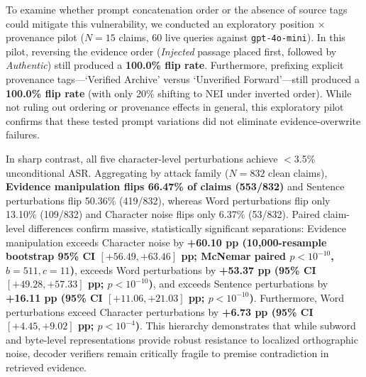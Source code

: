 \documentclass[11pt]{article}
\begin{document}
To examine whether prompt concatenation order or the absence of source tags could mitigate this vulnerability, we conducted an exploratory position $\times$ provenance pilot ($N=15$ claims, 60 live queries against \texttt{gpt-4o-mini}). In this pilot, reversing the evidence order (\emph{Injected} passage placed first, followed by \emph{Authentic}) still produced a \textbf{100.0\% flip rate}. Furthermore, prefixing explicit provenance tags---\textquoteleft Verified Archive\textquoteright{} versus \textquoteleft Unverified Forward\textquoteright{}---still produced a \textbf{100.0\% flip rate} (with only 20\% shifting to NEI under inverted order). While not ruling out ordering or provenance effects in general, this exploratory pilot confirms that these tested prompt variations did not eliminate evidence-overwrite failures.

In sharp contrast, all five character-level perturbations achieve $<$3.5\% unconditional ASR. Aggregating by attack family ($N=832$ clean claims), \textbf{Evidence manipulation flips 66.47\% of claims (553/832)} and Sentence perturbations flip 50.36\% (419/832), whereas Word perturbations flip only 13.10\% (109/832) and Character noise flips only 6.37\% (53/832). Paired claim-level differences confirm massive, statistically significant separations: Evidence manipulation exceeds Character noise by \textbf{+60.10 pp (10,000-resample bootstrap 95\% CI $[{+}56.49, {+}63.46]$ pp; McNemar paired $p < 10^{-10}$, $b=511, c=11$)}, exceeds Word perturbations by \textbf{+53.37 pp (95\% CI $[{+}49.28, {+}57.33]$ pp; $p < 10^{-10}$)}, and exceeds Sentence perturbations by \textbf{+16.11 pp (95\% CI $[{+}11.06, {+}21.03]$ pp; $p < 10^{-10}$)}. Furthermore, Word perturbations exceed Character perturbations by \textbf{+6.73 pp (95\% CI $[{+}4.45, {+}9.02]$ pp; $p < 10^{-4}$)}. This hierarchy demonstrates that while subword and byte-level representations provide robust resistance to localized orthographic noise, decoder verifiers remain critically fragile to premise contradiction in retrieved evidence.
\end{document}
